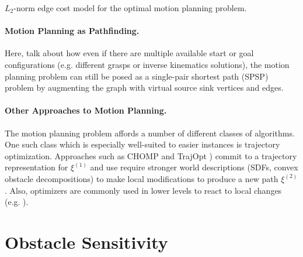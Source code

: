 \begin{marginfigure}
   \centering
   \caption{$L_2$-norm edge cost model
      for the optimal motion planning problem.}
\end{marginfigure}



\paragraph{Motion Planning as Pathfinding.}
\label{subsec:roadmaps:planning-as-pathfinding}
Here, talk about how even if there are multiple available
start or goal configurations
(e.g. different grasps or inverse kinematics solutions),
the motion planning problem can still be posed as a
single-pair shortest path (SPSP) problem
by augmenting the graph with virtual source sink vertices
and edges.

\paragraph{Other Approaches to Motion Planning.}
The motion planning problem affords a number of different classes of
algorithms.
One such class which is especially well-suited to easier instances
is trajectory optimization.
Approaches such as CHOMP \citep{zucker2013chomp}
and TrajOpt \citep{schulman2013trajopt})
commit to a trajectory representation for $\xi^{(1)}$
and use require stronger world descriptions
(SDFs, convex obstacle decompositions)
to make local modifications
to produce a new path $\xi^{(2)}$.
Also,
optimizers are commonly used in lower levels to react to local
changes (e.g. \citep{quinlan1994modification}).

\section{Obstacle Sensitivity}
\label{sec:roadmaps:sensitivity}

